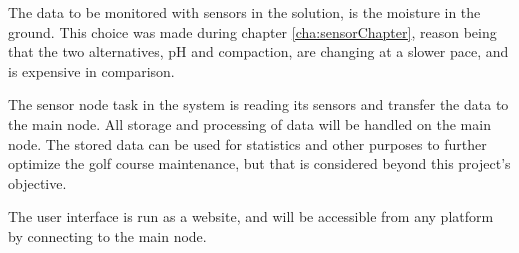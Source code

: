 The data to be monitored with sensors in the solution, is the moisture in the ground. This choice was made during chapter \ref{cha:sensorChapter}, reason being that the two alternatives, pH and compaction, are changing at a slower pace, and is expensive in comparison.

The sensor node task in the system is reading its sensors and transfer the data to the main node. All storage and processing of data will be handled on the main node.
The stored data can be used for statistics and other purposes to further optimize the golf course maintenance, but that is considered beyond this project's objective.

The user interface is run as a website, and will be accessible from any platform by connecting to the main node.